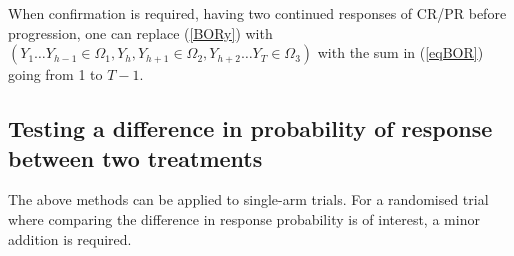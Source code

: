 \documentclass[10pt,A4]{article}
\begin{document}
When confirmation is required, having two continued responses of CR/PR before progression, one can replace (\ref{BORy}) with $(Y_1 \ldots Y_{h-1} \in \Omega_1, Y_h, Y_{h+1} \in \Omega_2, Y_{h+2} \ldots Y_T \in \Omega_3)$ with the sum in (\ref{eqBOR}) going from 1 to $T-1$.


\subsection{Testing a difference in probability of response between two treatments}\label{twoarms}
The above methods can be applied to single-arm trials. For a randomised trial where comparing the difference in response probability is of interest, a minor addition is required.
\end{document}
